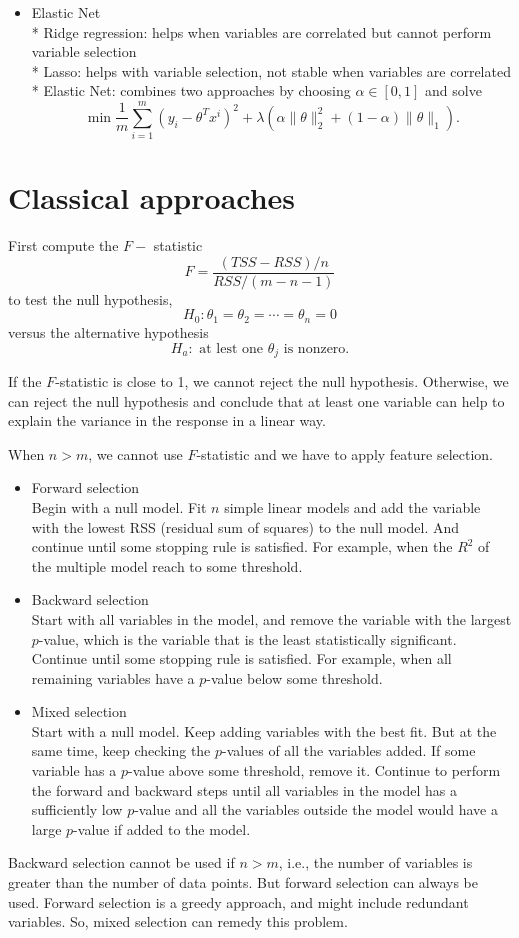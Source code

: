 \documentclass[twoside,12pt]{article}
\begin{document}
\begin{itemize}
\item Elastic Net\\
* Ridge regression: helps when variables are correlated but cannot perform variable selection \\
* Lasso: helps with variable selection, not stable when variables are correlated \\
* Elastic Net: combines two approaches by choosing $\alpha \in [0, 1]$ and solve 
$$\min \frac 1 m \sum_{i=1}^m (y_i - \theta^T x^i)^2 + \lambda (\alpha \|\theta\|_2^2 + (1-\alpha)\|\theta\|_1).$$
\end{itemize}

\section{Classical approaches}
First compute the $F-$ statistic $$F = \frac{(TSS - RSS)/n}{RSS/(m-n-1)}$$ to test the null hypothesis,
$$H_0: \theta_1 = \theta_2 = \cdots = \theta_n = 0 $$
versus the alternative hypothesis 
$$H_a: \text{ at lest one } \theta_j \text{ is nonzero.}$$

If the $F$-statistic is close to 1, we cannot reject the null hypothesis. Otherwise, we can reject the null hypothesis and conclude that at least one variable can help to explain the variance in the response in a linear way. 

When $n > m$, we cannot use $F$-statistic and we have to apply feature selection.

\begin{itemize}
\item Forward selection \\
Begin with a null model. Fit $n$ simple linear models and add the variable with the lowest RSS (residual sum of squares) to the null model. And continue until some stopping rule is satisfied. For example, when the $R^2$ of the multiple model reach to some threshold. 

\item Backward selection \\
Start with all variables in the model, and remove the variable with the largest $p$-value, which is the variable that is the least statistically significant. Continue until some stopping rule is satisfied. For example, when all remaining variables have a $p$-value below some threshold.

\item Mixed selection \\
Start with a null model. Keep adding variables with the best fit. But at the same time, keep checking the $p$-values of all the variables added. If some variable has a $p$-value above some threshold, remove it. Continue to perform the forward and backward steps until all variables in the model has a sufficiently low $p$-value and all the variables outside the model would have a large $p$-value if added to the model. 
\end{itemize}
Backward selection cannot be used if $n > m$, i.e., the number of variables is greater than the number of data points. But forward selection can always be used. Forward selection is a greedy approach, and might include redundant variables. So, mixed selection can remedy this problem. 
\end{document}
